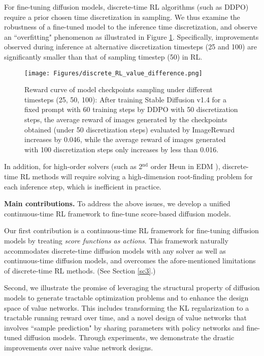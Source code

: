 \documentclass{article}
\theoremstyle{plain}
\theoremstyle{definition}
\theoremstyle{remark}
\begin{document}
For fine-tuning diffusion models, discrete-time RL algorithms (such as DDPO) require a prior chosen time discretization in sampling. 
We thus examine the robustness of a fine-tuned model to the inference time discretization, and observe an ``overfitting" phenomenon as illustrated in Figure \ref{Fig: Discrete RL overfits when fine-tuning SD v1.4}. Specifically, improvements observed during inference at alternative discretization timesteps (25 and 100) are significantly smaller than that of sampling timestep (50) in RL. 
\vspace{-2pt}
\begin{figure}[htbp]
    \centering
    \texttt{[image: Figures/discrete\_RL\_value\_difference.png]}
    \caption{Reward curve of model checkpoints sampling under different timesteps (25, 50, 100): After training Stable Diffusion v1.4 for a fixed prompt with 60 training steps by DDPO \cite{DDPO} with 50 discretization steps, the average reward of images generated by the checkpoints obtained (under 50 discretization steps) evaluated by ImageReward \cite{ImageReward} increases by 0.046, while the average reward of images generated with 100 discretization steps only increases by less than 0.016.}
    \label{Fig: Discrete RL overfits when fine-tuning SD v1.4}
\end{figure}
\vspace{-10pt}

In addition, 
for high-order solvers (such as 2$^{\text{nd}}$ order Heun in EDM \cite{karras2022elucidating}), discrete-time RL methods will require solving a high-dimension root-finding problem for each inference step, which is inefficient in practice.

\textbf{Main contributions.} 
To address the above issues, we develop a unified continuous-time RL framework to fine-tune score-based diffusion models. 

Our first contribution is a continuous-time RL framework for fine-tuning diffusion models by treating {\it score functions as actions}. This framework naturally accommodates discrete-time diffusion models with any solver as well as continuous-time diffusion models, and overcomes the afore-mentioned limitations of discrete-time RL methods. (See Section \ref{sc3}.)

Second, we illustrate the promise of leveraging the structural property of diffusion models to generate tractable optimization problems and to enhance the design space of value networks. This includes transforming the KL regularization to a tractable running reward over time, and a novel design of value networks that involves ``sample prediction" by sharing parameters with policy networks and fine-tuned diffusion models. Through experiments, we demonstrate the drastic improvements over naive value network designs.
\end{document}
